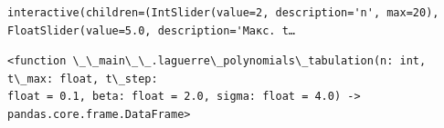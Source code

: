 \documentclass[11pt]{article}
\makeatletter
\newcommand{\boxspacing}{\kern\kvtcb@left@rule\kern\kvtcb@boxsep}
\newcommand{\prompt}[4]{
        {\ttfamily\llap{{\color{#2}[#3]:\hspace{3pt}#4}}\vspace{-\baselineskip}}
    }
\makeatother
\begin{document}
    
    \begin{Verbatim}[commandchars=\\\{\}]
interactive(children=(IntSlider(value=2, description='n', max=20), FloatSlider(value=5.0, description='Макс. t…
    \end{Verbatim}

    
            \begin{tcolorbox}[breakable, size=fbox, boxrule=.5pt, pad at break*=1mm, opacityfill=0]
\prompt{Out}{outcolor}{5}{\boxspacing}
\begin{Verbatim}[commandchars=\\\{\}]
<function \_\_main\_\_.laguerre\_polynomials\_tabulation(n: int, t\_max: float, t\_step:
float = 0.1, beta: float = 2.0, sigma: float = 4.0) ->
pandas.core.frame.DataFrame>
\end{Verbatim}
\end{tcolorbox}
        
\end{document}
